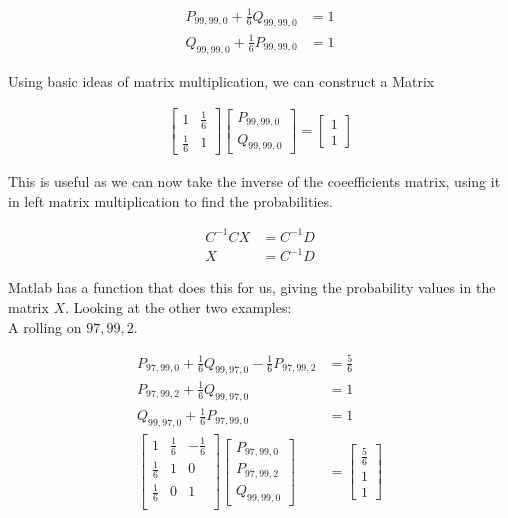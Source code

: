 \documentclass[a4paper,titlepage]{article}
\begin{document}
\begin{align*}
	P_{99,99,0} + \frac{1}{6}Q_{99,99,0} &= 1\\
	Q_{99,99,0} + \frac{1}{6}P_{99,99,0} &= 1
\end{align*}

Using basic ideas of matrix multiplication, we can construct a Matrix

\begin{align*}
	\begin{bmatrix}
	    1          & \frac{1}{6}\\
	    \frac{1}{6} & 1
	\end{bmatrix}
	\begin{bmatrix}
		P_{99,99,0}\\
		Q_{99,99,0}
	\end{bmatrix}
	=
	\begin{bmatrix}
		1\\
		1
	\end{bmatrix}
\end{align*}

This is useful as we can now take the inverse of the coeefficients matrix, using it in left matrix multiplication to find the probabilities.

\begin{align*}
	C^{-1}CX &= C^{-1}D\\
	X        &= C^{-1}D
\end{align*}

Matlab has a function that does this for us, giving the probability values in the matrix $X$.
Looking at the other two examples:\\
A rolling on $97,99,2$.

\begin{align*}
	P_{97,99,0} + \frac{1}{6}Q_{99,97,0} - \frac{1}{6}P_{97,99,2} &= \frac{5}{6}\\
	P_{97,99,2} + \frac{1}{6}Q_{99,97,0}                          &=  1\\
	Q_{99,97,0} + \frac{1}{6}P_{97,99,0}                          &= 1\\
	\begin{bmatrix}
		1           & \frac{1}{6} & -\frac{1}{6}\\
		\frac{1}{6} & 1           & 0\\
		\frac{1}{6} & 0           & 1\\
	\end{bmatrix}
	\begin{bmatrix}
		P_{97,99,0}\\
		P_{97,99,2}\\
		Q_{99,99,0}
	\end{bmatrix}
	& =
	\begin{bmatrix}
		\frac{5}{6}\\
		1\\
		1
	\end{bmatrix}
\end{align*}
\end{document}
